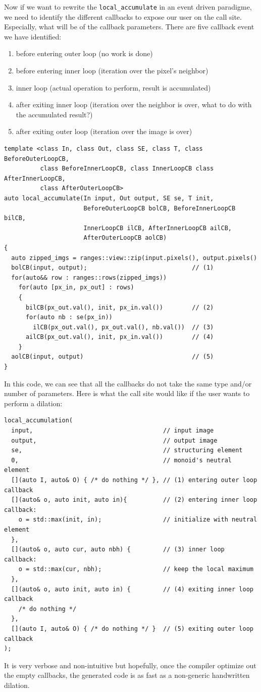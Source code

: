 Now if we want to rewrite the \texttt{local\_accumulate} in an event driven paradigme, we need to identify the different
callbacks to expose our user on the call site. Especially, what will be of the callback parameters. There are five
callback event we have identified:
\begin{enumerate}
  \item before entering outer loop (no work is done)
  \item before entering inner loop (iteration over the pixel's neighbor)
  \item inner loop (actual operation to perform, result is accumulated)
  \item after exiting inner loop (iteration over the neighbor is over, what to do with the accumulated result?)
  \item after exiting outer loop (iteration over the image is over)
\end{enumerate}
\begin{verbatim}
template <class In, class Out, class SE, class T, class BeforeOuterLoopCB,
          class BeforeInnerLoopCB, class InnerLoopCB class AfterInnerLoopCB,
          class AfterOuterLoopCB>
auto local_accumulate(In input, Out output, SE se, T init,
                      BeforeOuterLoopCB bolCB, BeforeInnerLoopCB bilCB,
                      InnerLoopCB ilCB, AfterInnerLoopCB ailCB,
                      AfterOuterLoopCB aolCB)
{
  auto zipped_imgs = ranges::view::zip(input.pixels(), output.pixels()
  bolCB(input, output);                             // (1)
  for(auto&& row : ranges::rows(zipped_imgs))
    for(auto [px_in, px_out] : rows)
    {
      bilCB(px_out.val(), init, px_in.val())        // (2)
      for(auto nb : se(px_in))
        ilCB(px_out.val(), px_out.val(), nb.val())  // (3)
      ailCB(px_out.val(), init, px_in.val())        // (4)
    }
  aolCB(input, output)                              // (5)
}
\end{verbatim}
In this code, we can see that all the callbacks do not take the same type and/or number of parameters. Here is what the
call site would like if the user wants to perform a dilation:
\begin{verbatim}
local_accumulation(
  input,                                    // input image
  output,                                   // output image
  se,                                       // structuring element
  0,                                        // monoid's neutral element
  [](auto I, auto& O) { /* do nothing */ }, // (1) entering outer loop callback
  [](auto& o, auto init, auto in){          // (2) entering inner loop callback:
    o = std::max(init, in);                 // initialize with neutral element
  },
  [](auto& o, auto cur, auto nbh) {         // (3) inner loop callback:
    o = std::max(cur, nbh);                 // keep the local maximum
  },
  [](auto& o, auto init, auto in) {         // (4) exiting inner loop callback
    /* do nothing */
  },
  [](auto I, auto& O) { /* do nothing */ }  // (5) exiting outer loop callback
);
\end{verbatim}
It is very verbose and non-intuitive but hopefully, once the compiler optimize out the empty callbacks, the generated
code is as fast as a non-generic handwritten dilation.

